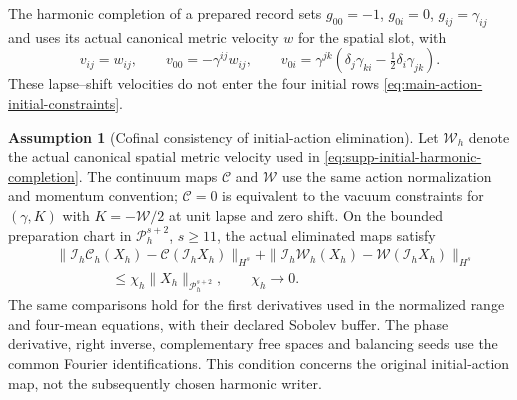 \documentclass[11pt]{article}
\numberwithin{equation}{section}
\theoremstyle{definition}
\newtheorem{assumption}[assumption]{Assumption}
\theoremstyle{remark}
\begin{document}
The harmonic completion of a prepared record sets
$g_{00}=-1$, $g_{0i}=0$, $g_{ij}=\gamma_{ij}$ and uses its actual canonical
metric velocity $w$ for the spatial slot, with
\begin{equation}
 v_{ij}=w_{ij},\qquad
 v_{00}=-\gamma^{ij}w_{ij},\qquad
 v_{0i}=\gamma^{jk}\left(\delta_j\gamma_{ki}
             -\tfrac12\delta_i\gamma_{jk}\right).
 \label{eq:supp-initial-harmonic-completion}
\end{equation}
These lapse--shift velocities do not enter the four initial rows
\eqref{eq:main-action-initial-constraints}.

\begin{assumption}[Cofinal consistency of initial-action elimination]
\label{ass:supp-initial-consistency}
Let $\mathscr W_h$ denote the actual canonical spatial metric velocity
used in \eqref{eq:supp-initial-harmonic-completion}.  The continuum maps
$\mathscr C$ and $\mathscr W$ use the same action normalization and momentum
convention; $\mathscr C=0$ is equivalent to the vacuum constraints for
$(\gamma,K)$ with $K=-\mathscr W/2$ at unit lapse and zero shift.
On the bounded preparation chart in $\mathcal P_h^{s+2}$, $s\ge11$, the
actual eliminated maps satisfy
\begin{equation}
 \begin{split}
 &\|\mathcal I_h\mathscr C_h(X_h)
                 -\mathscr C(\mathcal I_hX_h)\|_{H^s}
 +\|\mathcal I_h\mathscr W_h(X_h)
                 -\mathscr W(\mathcal I_hX_h)\|_{H^s}\\
 &\hspace{4em}\le\chi_h\|X_h\|_{\mathcal P_h^{s+2}},
 \qquad \chi_h\longrightarrow0.
 \end{split}
 \label{eq:supp-initial-consistency-budget}
\end{equation}
The same comparisons hold for the first derivatives used in the normalized
range and four-mean equations, with their declared Sobolev buffer.
The phase derivative, right inverse, complementary free spaces and balancing
seeds use the common Fourier identifications.  This condition concerns the
original initial-action map, not the subsequently chosen harmonic writer.
\end{assumption}
\end{document}
